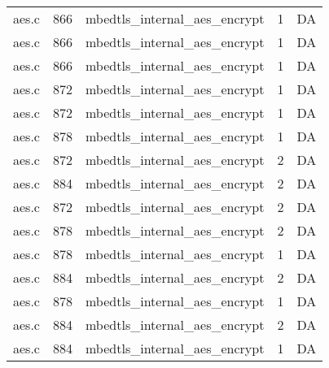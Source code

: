\begin{table}
\begin{tabular}{lrlrr}
aes.c& 866&mbedtls\_internal\_aes\_encrypt&1 &DA\\
aes.c& 866&mbedtls\_internal\_aes\_encrypt&1 &DA\\
aes.c& 866&mbedtls\_internal\_aes\_encrypt&1 &DA\\
aes.c& 872&mbedtls\_internal\_aes\_encrypt&1 &DA\\
aes.c& 872&mbedtls\_internal\_aes\_encrypt&1 &DA\\
aes.c& 878&mbedtls\_internal\_aes\_encrypt&1 &DA\\
aes.c& 872&mbedtls\_internal\_aes\_encrypt&2 &DA\\
aes.c& 884&mbedtls\_internal\_aes\_encrypt&2 &DA\\
aes.c& 872&mbedtls\_internal\_aes\_encrypt&2 &DA\\
aes.c& 878&mbedtls\_internal\_aes\_encrypt&2 &DA\\
aes.c& 878&mbedtls\_internal\_aes\_encrypt&1 &DA\\
aes.c& 884&mbedtls\_internal\_aes\_encrypt&2 &DA\\
aes.c& 878&mbedtls\_internal\_aes\_encrypt&1 &DA\\
aes.c& 884&mbedtls\_internal\_aes\_encrypt&2 &DA\\
aes.c& 884&mbedtls\_internal\_aes\_encrypt&1 &DA\\
\hline
\end{tabular}
\renewcommand{\baselinestretch}{1.0}\selectfont
\end{table}
